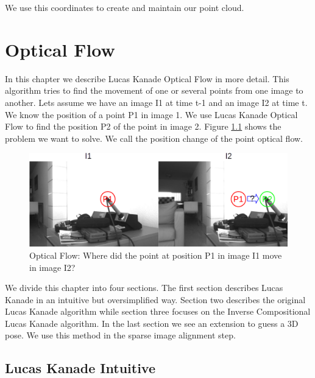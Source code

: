 \documentclass[11pt,a4paper,titlepage,oneside]{report}
\begin{document}
We use this coordinates to create and maintain our point cloud.

\chapter{Optical Flow}\label{ch:opt_flow}

In this chapter we describe Lucas Kanade Optical Flow in more detail. This algorithm tries to find the movement of one or several points from one image to another. Lets assume we have an image I1 at time t-1 and an image I2 at time t. We know the position of a point P1 in image 1. We use Lucas Kanade Optical Flow to find the position P2 of the point in image 2. Figure \ref{fig:optical_flow} shows the problem we want to solve. We call the position change of the point optical flow.

\begin{figure}[H]
  \includegraphics[width=1.0\textwidth]{img/optical_flow.png}
  \caption{Optical Flow: Where did the point at position P1 in image I1 move in image I2?}\label{fig:optical_flow}
\end{figure}

We divide this chapter into four sections. The first section describes Lucas Kanade in an intuitive but oversimplified way. Section two describes the original Lucas Kanade algorithm while section three focuses on the Inverse Compositional Lucas Kanade algorithm. In the last section we see an extension to guess a 3D pose. We use this method in the sparse image alignment step.

\section{Lucas Kanade Intuitive}
\end{document}
